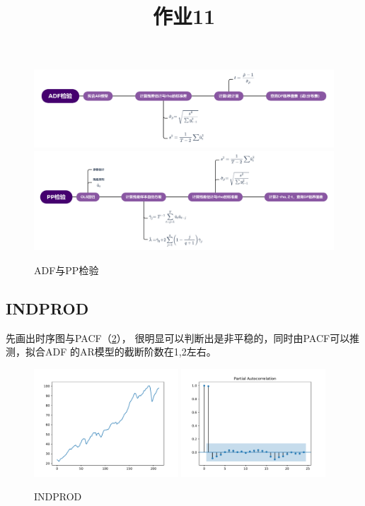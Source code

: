 \documentclass[cn]{homework}
\title{作业11}
\begin{document}
    \maketitle
    \problem
    \begin{figure}[h]
        \centering
        \includegraphics[width=\textwidth]{ADF}
        \includegraphics[width=\textwidth]{PP}
        \caption{ADF与PP检验}
        \label{fig:ADF PP}
    \end{figure}

    \problem
    \subsection{INDPROD}
    先画出时序图与PACF（\cref{fig:INDPROD}），
    很明显可以判断出是非平稳的，同时由PACF可以推测，拟合ADF
    的AR模型的截断阶数在1,2左右。
    
    \begin{figure}[h]
        \centering
        \includegraphics[width=0.48\textwidth]{INDPROD-trend}
        \includegraphics[width=0.48\textwidth]{INDPROD-pacf}
        \caption{INDPROD}
        \label{fig:INDPROD}
    \end{figure}
\end{document}
